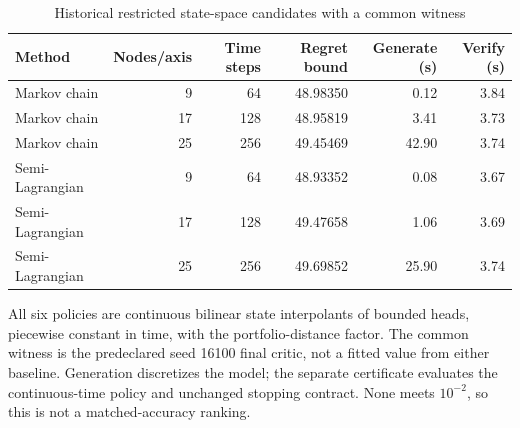\begin{table}[htbp]\centering\small
\caption{Historical restricted state-space candidates with a common witness}\label{tab:r16baselines}
\begin{tabular}{lrrrrr}
\toprule
Method & Nodes/axis & Time steps & Regret bound & Generate (s) & Verify (s)\\\midrule
Markov chain & 9 & 64 & 48.98350 & 0.12 & 3.84\\
Markov chain & 17 & 128 & 48.95819 & 3.41 & 3.73\\
Markov chain & 25 & 256 & 49.45469 & 42.90 & 3.74\\
Semi-Lagrangian & 9 & 64 & 48.93352 & 0.08 & 3.67\\
Semi-Lagrangian & 17 & 128 & 49.47658 & 1.06 & 3.69\\
Semi-Lagrangian & 25 & 256 & 49.69852 & 25.90 & 3.74\\
\bottomrule\end{tabular}
\par\smallskip\footnotesize All six policies are continuous bilinear state interpolants of bounded heads, piecewise constant in time, with the portfolio-distance factor. The common witness is the predeclared seed 16100 final critic, not a fitted value from either baseline. Generation discretizes the model; the separate certificate evaluates the continuous-time policy and unchanged stopping contract. None meets $10^{-2}$, so this is not a matched-accuracy ranking.
\end{table}
